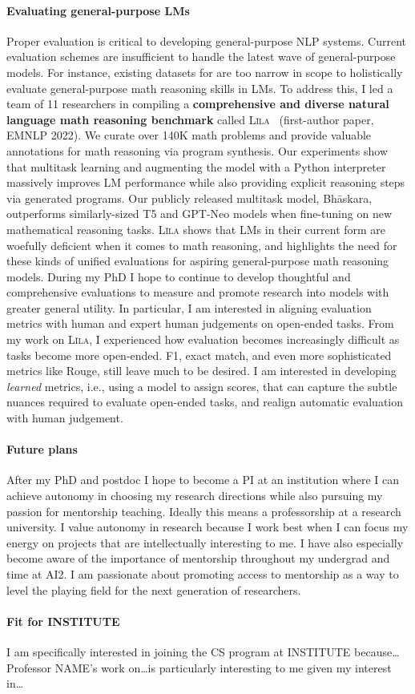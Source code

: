 \documentclass[11pt]{article}
\newcommand\lila{\textsc{L\={\i}la}\xspace}
\newcommand\inst{INSTITUTE\xspace}
\begin{document}
\paragraph{Evaluating general-purpose LMs}
Proper evaluation is critical to developing general-purpose NLP systems.
Current evaluation schemes are insufficient to handle
the latest wave of general-purpose models. 
For instance, existing datasets for are too narrow in scope 
to holistically evaluate general-purpose math reasoning skills in LMs.
To address this,
I led a team of 11 researchers in compiling a
\textbf{comprehensive and diverse natural language math reasoning benchmark} 
called \lila~\cite{Mishra2022Lila} (first-author paper, EMNLP 2022).
We curate over 140K math problems
and provide valuable annotations for math reasoning via program synthesis. 
Our experiments show that multitask learning 
and augmenting the model with a Python interpreter
massively improves LM performance 
while also providing explicit reasoning steps via generated programs.
Our publicly released multitask model, Bh\=askara, 
outperforms similarly-sized T5 and GPT-Neo models
when fine-tuning on new mathematical reasoning tasks.
\lila shows that LMs 
in their current form 
are woefully deficient when it comes to math reasoning,
and highlights the need for these kinds of unified evaluations for 
aspiring general-purpose math reasoning models.
During my PhD I hope to continue to develop thoughtful and comprehensive evaluations 
to measure and promote research into models with greater general utility.
In particular, I am interested in aligning evaluation metrics
with human and expert human judgements on open-ended tasks. 
From my work on \lila, 
I experienced how evaluation becomes increasingly difficult 
as tasks become more open-ended.
F1, exact match, and even more sophisticated metrics like Rouge,
still leave much to be desired.
I am interested in developing \emph{learned} metrics, 
i.e., using a model to assign scores,
that can capture the subtle nuances required to evaluate open-ended tasks,
and realign automatic evaluation with human judgement.

\paragraph{Future plans}
After my PhD and postdoc I hope to become a PI 
at an institution where I can achieve autonomy in choosing my research directions
while also pursuing my passion for mentorship teaching.
Ideally this means a professorship at a research university.
I value autonomy in research because I work best 
when I can focus my energy on projects 
that are intellectually interesting to me.
I have also especially become aware of the importance of mentorship 
throughout my undergrad and time at AI2.
I am passionate about promoting access to mentorship 
as a way to level the playing field 
for the next generation of researchers.

\paragraph{Fit for \inst} I am specifically interested in joining the CS program at 
\inst because\ldots Professor NAME's work on\ldots is particularly interesting to me given my interest in\ldots



\end{document}
